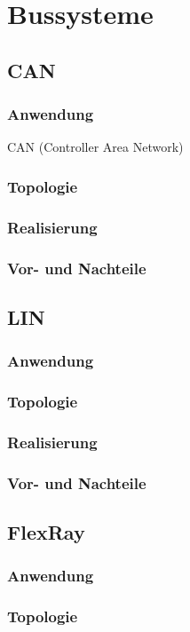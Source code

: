 \section{Bussysteme}
\subsection{CAN}
\subsubsection{Anwendung}
CAN (Controller Area Network) 
\subsubsection{Topologie}
\subsubsection{Realisierung}
\subsubsection{Vor- und Nachteile}

\subsection{LIN}
\subsubsection{Anwendung}
\subsubsection{Topologie}
\subsubsection{Realisierung}
\subsubsection{Vor- und Nachteile}

\subsection{FlexRay}
\subsubsection{Anwendung}
\subsubsection{Topologie}
